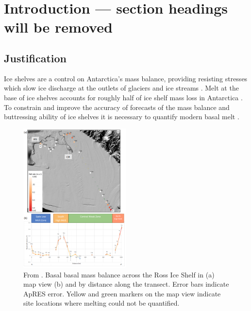 \label{ch:apres}



\section{Introduction --- section headings will be removed}



\subsection{Justification}

Ice shelves are a control on Antarctica's mass balance, providing resisting stresses  which slow ice discharge at the outlets of glaciers and ice streams  \citep{de2003glacier,gudmundsson2003transmission,dupont2005assessment}.
Melt at the base of ice shelves accounts for roughly half of ice shelf mass loss in Antarctica \citep{rignot2013ice}. To constrain and improve the accuracy of  forecasts of the mass balance and buttressing ability of ice shelves it is necessary to quantify modern basal melt  \citep[e.g.][] {furst2016safety}. 


\begin{figure}[!ht]
\centering
\includegraphics[width=0.5\textwidth]{chapters/3/RIS_melt.png}
\caption[]{From \cite{snodgrass2021melting}. Basal basal mass balance across the Ross Ice Shelf in (a) map view (b) and by distance along
the transect. Error bars indicate ApRES error. Yellow and green
markers on the map view indicate site locations where melting could not be quantified.  }
\label{fig:RIS_melt}
\end{figure}  

